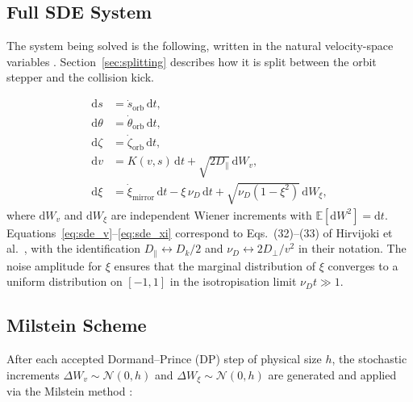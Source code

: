 \documentclass[11pt]{article}
\newcommand{\dd}{\mathrm{d}}
\begin{document}
\subsection{Full SDE System}

The system being solved is the following, written in the natural velocity-space
variables \cite{hirvijoki2013}.  Section~\ref{sec:splitting} describes how it is split
between the orbit stepper and the collision kick.

\begin{align}
  \dd s      &= \dot s_{\mathrm{orb}}\,\dd t, \\
  \dd\theta  &= \dot\theta_{\mathrm{orb}}\,\dd t, \\
  \dd\zeta   &= \dot\zeta_{\mathrm{orb}}\,\dd t, \\
  \dd v      &= K(v,s)\,\dd t
               + \sqrt{2D_{\parallel}}\,\dd W_v, \label{eq:sde_v}\\
  \dd\xi     &= \dot\xi_{\mathrm{mirror}}\,\dd t
               - \xi\,\nu_D\,\dd t
               + \sqrt{\nu_D(1-\xi^2)}\,\dd W_\xi, \label{eq:sde_xi}
\end{align}
where $\dd W_v$ and $\dd W_\xi$ are independent Wiener increments with
$\mathbb{E}[\dd W^2]=\dd t$.
Equations~\eqref{eq:sde_v}--\eqref{eq:sde_xi} correspond to
Eqs.\ (32)--(33) of Hirvijoki et al.\ \cite{hirvijoki2013}, with the
identification $D_\parallel \leftrightarrow D_k/2$ and $\nu_D \leftrightarrow 2D_\perp/v^2$
in their notation.  The noise amplitude for $\xi$ ensures that the marginal
distribution of $\xi$ converges to a uniform distribution on $[-1,1]$ in the
isotropisation limit $\nu_D t\gg 1$.

\subsection{Milstein Scheme}
\label{sec:milstein}

After each accepted Dormand--Prince (DP) step of physical size $h$, the stochastic
increments $\Delta W_v\sim\mathcal{N}(0,h)$ and $\Delta W_\xi\sim\mathcal{N}(0,h)$
are generated and applied via the Milstein method \cite{kloeden1992}:
\end{document}
